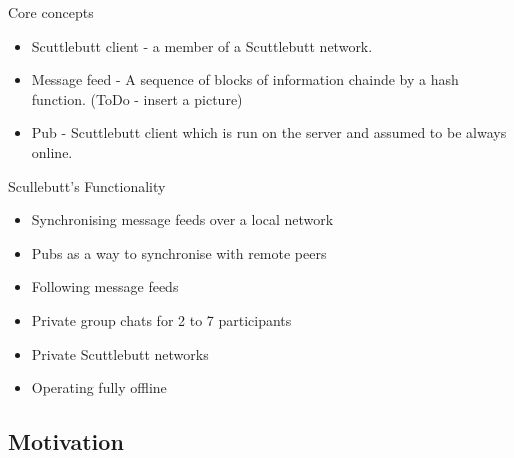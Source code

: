\documentclass{beamer}
\begin{document}

\begin{frame}{Core concepts}
\begin{itemize}
    \item Scuttlebutt client - a member of a Scuttlebutt network.
    \item Message feed - A sequence of blocks of information chainde by a hash function. (ToDo - insert a picture)
    \item Pub - Scuttlebutt client which is run on the server and assumed to be always online.
\end{itemize}
\end{frame}


\begin{frame}{Scullebutt's Functionality}
\begin{itemize}
    \item Synchronising message feeds over a local network
    \item Pubs as a way to synchronise with remote peers
    \item Following message feeds
    \item Private group chats for 2 to 7 participants
    \item Private Scuttlebutt networks
    \item Operating fully offline
\end{itemize}
\end{frame}




\subsection{Motivation}

\end{document}
